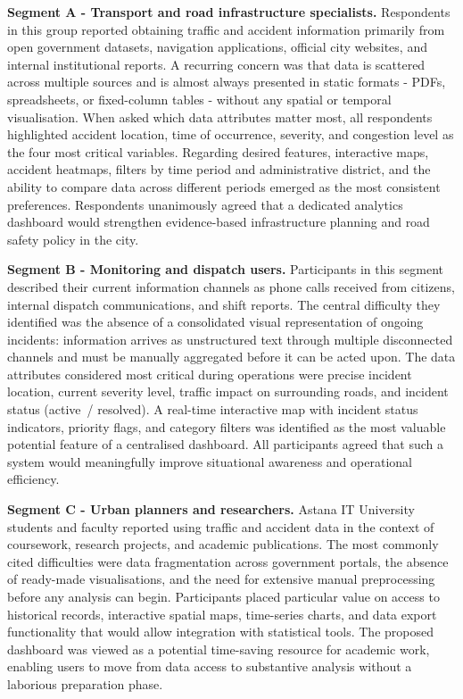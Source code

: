 \documentclass[12pt,a4paper]{report}
\begin{document}
\textbf{Segment A - Transport and road infrastructure specialists.} Respondents in this group reported obtaining traffic and accident information primarily
from open government datasets, navigation applications, official city websites, and
internal institutional reports. A recurring concern was that data is scattered across
multiple sources and is almost always presented in static formats - PDFs, spreadsheets,
or fixed-column tables - without any spatial or temporal visualisation. When asked which
data attributes matter most, all respondents highlighted accident location, time of
occurrence, severity, and congestion level as the four most critical variables. Regarding
desired features, interactive maps, accident heatmaps, filters by time period and
administrative district, and the ability to compare data across different periods
emerged as the most consistent preferences. Respondents unanimously agreed that a
dedicated analytics dashboard would strengthen evidence-based infrastructure planning
and road safety policy in the city.

\textbf{Segment B - Monitoring and dispatch users.} Participants in this segment described their current information channels as phone calls
received from citizens, internal dispatch communications, and shift reports. The central
difficulty they identified was the absence of a consolidated visual representation of
ongoing incidents: information arrives as unstructured text through multiple disconnected
channels and must be manually aggregated before it can be acted upon. The data attributes
considered most critical during operations were precise incident location, current severity
level, traffic impact on surrounding roads, and incident status (active~/ resolved). A
real-time interactive map with incident status indicators, priority flags, and category
filters was identified as the most valuable potential feature of a centralised dashboard.
All participants agreed that such a system would meaningfully improve situational awareness
and operational efficiency.

\textbf{Segment C - Urban planners and researchers.} Astana IT University students and faculty reported using traffic and accident data in the
context of coursework, research projects, and academic publications. The most commonly
cited difficulties were data fragmentation across government portals, the absence of
ready-made visualisations, and the need for extensive manual preprocessing before any
analysis can begin. Participants placed particular value on access to historical records,
interactive spatial maps, time-series charts, and data export functionality that would
allow integration with statistical tools. The proposed dashboard was viewed as a
potential time-saving resource for academic work, enabling users to move from data
access to substantive analysis without a laborious preparation phase.
\end{document}
